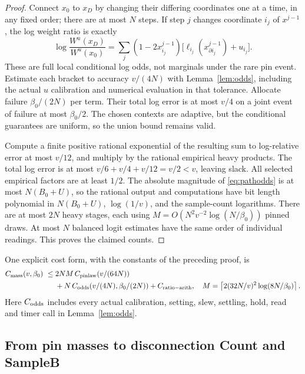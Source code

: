 \begin{proof}
Connect $x_0$ to $x_D$ by changing their differing coordinates one at a
time, in any fixed order; there are at most $N$ steps. If step $j$ changes
coordinate $i_j$ of $x^{j-1}$, the log weight ratio is exactly
\begin{equation}\label{eq:pathodds}
 \log\frac{W^u(x_D)}{W^u(x_0)}
 =\sum_j(1-2x^{j-1}_{i_j})
        \bigl[\ell_{i_j}(x^{j-1}_{\partial i_j})+u_{i_j}\bigr].
\end{equation}
These are full local conditional log odds, not marginals under the rare
pin event. Estimate each bracket to accuracy $v/(4N)$ with
Lemma~\ref{lem:odds}, including the actual $u$ calibration and numerical
evaluation in that tolerance. Allocate failure $\beta_0/(2N)$ per term.
Their total log error is at most $v/4$ on a joint event of failure at most
$\beta_0/2$. The chosen contexts are adaptive, but the conditional
guarantees are uniform, so the union bound remains valid.

Compute a finite positive rational exponential of the resulting sum to
log-relative error at most $v/12$, and multiply by the rational empirical
heavy products. The total log error is at most
$v/6+v/4+v/12=v/2<v$, leaving slack. All selected empirical factors are at
least $1/2$. The absolute magnitude of \eqref{eq:pathodds} is at most
$N(B_0+U)$, so the rational output and computations have bit length
polynomial in $N(B_0+U)$, $\log(1/v)$, and the sample-count logarithms.
There are at most $2N$ heavy stages, each using $M=O(N^2v^{-2}
\log(N/\beta_0))$ pinned draws. At most $N$ balanced logit estimates have
the same order of individual readings. This proves the claimed counts.
\end{proof}

One explicit cost form, with the constants of the preceding proof, is
\begin{equation}\label{eq:masscost}
 \begin{split}
 C_{\rm mass}(v,\beta_0)\ \le{}&
 2NM\,C_{\rm pinlaw}(v/(64N))\\
 &+N\,C_{\rm odds}(v/(4N),\beta_0/(2N))
   +C_{\rm ratio-arith},
 \quad M=\left\lceil2(32N/v)^2\log(8N/\beta_0)\right\rceil .
 \end{split}
\end{equation}
Here $C_{\rm odds}$ includes every actual calibration, setting, slew,
settling, hold, read and timer call in Lemma~\ref{lem:odds}.

\subsection{From pin masses to disconnection Count and SampleB}

